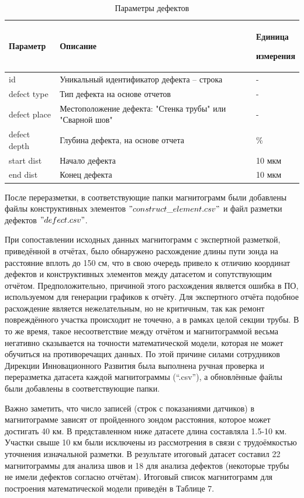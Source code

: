 \documentclass[a4paper,article,14pt]{extarticle}
\begin{document}
\begin{center}
    \begin{longtable}{|p{2cm}|p{12cm}|p{2cm}|}
        \caption{Параметры дефектов}\\\hline
        Параметр & Описание & Единица \par измерения \\ \hline
        id & Уникальный идентификатор дефекта – строка & - \\ \hline
        defect type & Тип дефекта на основе отчетов & - \\ \hline
        defect place & Местоположение дефекта: "Стенка трубы" или "Сварной шов"  & - \\ \hline
        defect depth & Глубина дефекта, на основе отчета  & \% \\ \hline
        start dist & Начало дефекта & 10 мкм \\ \hline
        end dist & Конец дефекта & 10 мкм \\ \hline
    \end{longtable}
\end{center}

После переразметки, в соответствующие папки магнитограмм были добавлены файлы конструктивных элементов 
$"construct\_element.csv"$ и файл разметки дефектов $"defect.csv"$.

При сопоставлении исходных данных магнитограмм с экспертной разметкой, приведённой в отчётах,
 было обнаружено расхождение длины пути зонда на расстояние вплоть до 150 см, что в свою очередь 
 привело к отличию координат дефектов и конструктивных элементов между датасетом и сопутствующим отчётом. 
 Предположительно, причиной этого расхождения является ошибка в ПО, используемом для генерации графиков к отчёту. 
 Для экспертного отчёта подобное расхождение является нежелательным, но не критичным, так как ремонт повреждённого 
 участка происходит не точечно, а в рамках целой секции трубы. В то же время, такое несоответствие между отчётом и 
 магнитограммой весьма негативно сказывается на точности математической модели, которая не может обучиться на противоречащих данных. 
 По этой причине силами сотрудников Дирекции Инновационного Развития была выполнена ручная проверка и переразметка
  датасета каждой магнитограммы (“.csv”), а обновлённые файлы были добавлены в соответствующие папки.

Важно заметить, что число записей (строк с показаниями датчиков) в магнитограмме зависят от пройденного 
зондом расстояния, которое может достигать 40 км. В представленном ниже датасете длина составляла 1.5-10 км. 
Участки свыше 10 км были исключены из рассмотрения в связи с трудоёмкостью уточнения изначальной разметки. 
В результате итоговый датасет составил 22 магнитограммы для анализа швов и 18 для анализа дефектов 
(некоторые трубы не имели дефектов согласно отчётам). Итоговый список магнитограмм для построения 
математической модели приведён в Таблице 7.
\end{document}
